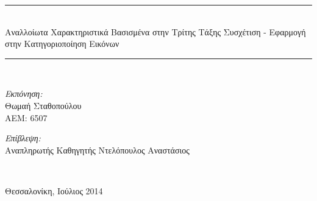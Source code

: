 \begin{titlepage}
\begin{center}
  \rule{350pt}{4pt} \\[0.4cm]
    \LARGE{Αναλλοίωτα Χαρακτηριστικά Βασισμένα στην Τρίτης Τάξης Συσχέτιση - Εφαρμογή στην Κατηγοριοποίηση Εικόνων} \\[0.4cm]
  \rule{350pt}{4pt} \\[6cm]

  \begin{minipage}{0.4\textwidth}
  \begin{flushleft} \large
  \emph{Εκπόνηση:} \\
 	 Θωμαή Σταθοπούλου\\
  	ΑΕΜ: 6507
  \end{flushleft}
  \end{minipage}
  \begin{minipage}{0.4\textwidth}
  \begin{flushright} \large
  \emph{Επίβλεψη:} \\
  Αναπληρωτής Καθηγητής Ντελόπουλος Αναστάσιος
  \end{flushright}
  \end{minipage}
  \\[1cm]
  \vfill

  \large Θεσσαλονίκη, Ιούλιος 2014
  
\end{center}
\end{titlepage}
\newevenside



\newevenside



\setcounter{tocdepth}{2}
\tableofcontents

\listoffigures

\listoftables

\newevenside
{}

